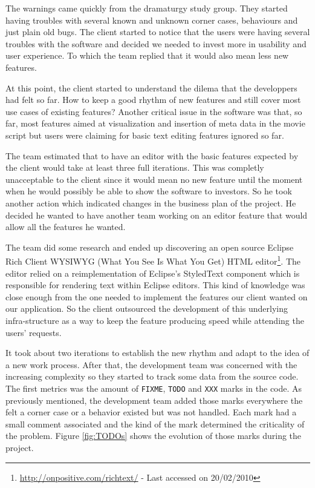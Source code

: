 \documentclass[lnbip]{svmultln}
\begin{document}
The warnings came quickly from the dramaturgy study group. They
started having troubles with several known and unknown corner cases,
behaviours and just plain old bugs. The client started to notice that
the users were having several troubles with the software and decided
we needed to invest more in usability and user experience. To which
the team replied that it would also mean less new features.

At this point, the client started to understand the dilema that the
developpers had felt so far. How to keep a good rhythm of new features
and still cover most use cases of existing features? Another critical
issue in the software was that, so far, most features aimed at
visualization and insertion of meta data in the movie script but users
were claiming for basic text editing features ignored so far.

The team estimated that to have an editor with the basic features
expected by the client would take at least three full iterations. This
was completly unacceptable to the client since it would mean no new
feature until the moment when he would possibly be able to show the
software to investors. So he took another action which indicated
changes in the business plan of the project. He decided he wanted to
have another team working on an editor feature that would allow all
the features he wanted.

The team did some research and ended up discovering an open source
Eclipse Rich Client WYSIWYG (What You See Is What You Get) HTML
editor\footnote{\url{http://onpositive.com/richtext/} - Last accessed
  on 20/02/2010}. The editor relied on a reimplementation of Eclipse's
StyledText component which is responsible for rendering text within
Eclipse editors. This kind of knowledge was close enough from the one
needed to implement the features our client wanted on our
application. So the client outsourced the development of this
underlying infra-structure as a way to keep the feature producing
speed while attending the users' requests.

It took about two iterations to establish the new rhythm and adapt to
the idea of a new work process. After that, the development team was
concerned with the increasing complexity so they started to track some
data from the source code. The first metrics was the amount of
\texttt{FIXME}, \texttt{TODO} and \texttt{XXX} marks in the code. As
previously mentioned, the development team added those marks
everywhere the felt a corner case or a behavior existed but was not
handled. Each mark had a small comment associated and the kind of the
mark determined the criticality of the problem. Figure \ref{fig:TODOs}
shows the evolution of those marks during the project.
\end{document}
